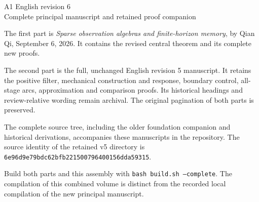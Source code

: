 \documentclass[11pt]{article}
\begin{document}
\thispagestyle{empty}
\begin{center}
\Large A1 English revision 6\\[1em]
\large Complete principal manuscript and retained proof companion
\end{center}
\bigskip
The first part is \emph{Sparse observation algebras and finite-horizon memory},
by Qian Qi, September 6, 2026. It contains the revised central theorem and
its complete new proofs.

\medskip
The second part is the full, unchanged English revision 5 manuscript.
It retains the positive filter, mechanical construction and response,
boundary control, all-stage arcs, approximation and comparison proofs.
Its historical headings and review-relative wording remain archival.
The original pagination of both parts is preserved.

\medskip
The complete source tree, including the older foundation companion and
historical derivations, accompanies these manuscripts in the repository.
The source identity of the retained v5 directory is
\texttt{6e96d9e79bdc62bfb221500796400156dda59315}.

\medskip
Build both parts and this assembly with \texttt{bash build.sh --complete}.
The compilation of this combined volume is distinct from the recorded local
compilation of the new principal manuscript.
\clearpage


\end{document}
